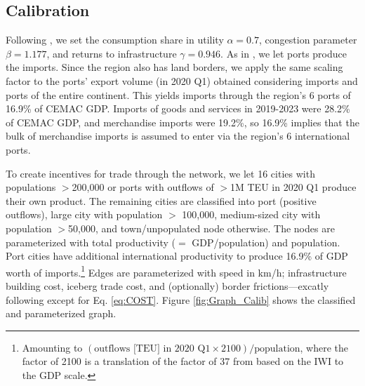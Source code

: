 \documentclass[a4paper]{article}
\begin{document}
\subsection{Calibration}

Following \citet{graff2024spatial}, we set the consumption share in utility $\alpha = 0.7$, congestion parameter $\beta = 1.177$, and returns to infrastructure $\gamma = 0.946$. As in \citet{krantz2024optimal}, we let ports produce the imports. Since the region also has land borders, we apply the same scaling factor to the ports' export volume (in 2020 Q1) obtained considering imports and ports of the entire continent. This yields imports through the region's 6 ports of 16.9\% of CEMAC GDP. Imports of goods and services in 2019-2023 were 28.2\% of CEMAC GDP, and merchandise imports were 19.2\%, so 16.9\% implies that the bulk of merchandise imports is assumed to enter via the region's 6 international ports.  \newline 

To create incentives for trade through the network, we let 16 cities with populations $>$200,000 or ports with outflows of $>$1M TEU in 2020 Q1 produce their own product. The remaining cities are classified into port (positive outflows), large city with population $>$ 100,000, medium-sized city with population $>$50,000, and town/unpopulated node otherwise. The nodes are parameterized with total productivity ($=$ GDP/population) and population. Port cities have additional international productivity to produce 16.9\% of GDP worth of imports.\footnote{Amounting to $(\text{outflows [TEU] in 2020 Q1}\times 2100)/\text{population}$, where the factor of 2100 is a translation of the factor of 37 from \citet{krantz2024optimal} based on the IWI to the GDP scale.\vspace{-2mm}} Edges are parameterized with speed in km/h; infrastructure building cost, iceberg trade cost, and (optionally) border frictions---excatly following \citet{krantz2024optimal} except for Eq. \ref{eq:COST}. Figure \ref{fig:Graph_Calib} shows the classified and parameterized graph. %
\end{document}
